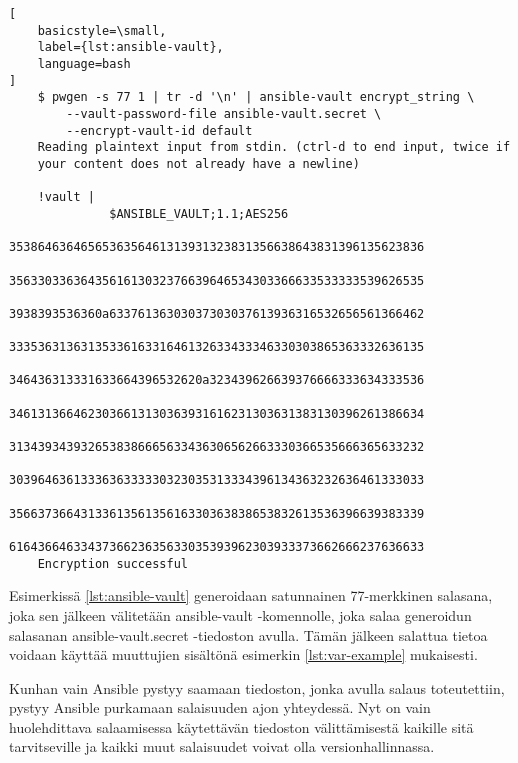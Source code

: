 \begin{lstlisting}[
    basicstyle=\small,
    label={lst:ansible-vault},
    language=bash
]
    $ pwgen -s 77 1 | tr -d '\n' | ansible-vault encrypt_string \
        --vault-password-file ansible-vault.secret \
        --encrypt-vault-id default
    Reading plaintext input from stdin. (ctrl-d to end input, twice if
    your content does not already have a newline)

    !vault |
              $ANSIBLE_VAULT;1.1;AES256
              3538646364656536356461313931323831356638643831396135623836
              3563303363643561613032376639646534303366633533333539626535
              3938393536360a63376136303037303037613936316532656561366462
              3335363136313533616331646132633433346330303865363332636135
              346436313331633664396532620a323439626639376666333634333536
              3461313664623036613130363931616231303631383130396261386634
              3134393439326538386665633436306562663330366535666365633232
              3039646361333636333330323035313334396134363232636461333033
              3566373664313361356135616330363838653832613536396639383339
              6164366463343736623635633035393962303933373662666237636633
    Encryption successful

\end{lstlisting}

Esimerkissä \ref{lst:ansible-vault} generoidaan satunnainen 77-merkkinen salasana,
joka sen jälkeen välitetään ansible-vault -komennolle, joka salaa generoidun
salasanan ansible-vault.secret -tiedoston avulla. Tämän jälkeen salattua tietoa
voidaan käyttää muuttujien sisältönä esimerkin \ref{lst:var-example} mukaisesti.



Kunhan vain Ansible pystyy saamaan tiedoston, jonka avulla salaus toteutettiin,
pystyy Ansible purkamaan salaisuuden ajon yhteydessä. Nyt on vain huolehdittava
salaamisessa käytettävän tiedoston välittämisestä kaikille sitä tarvitseville ja
kaikki muut salaisuudet voivat olla versionhallinnassa.
